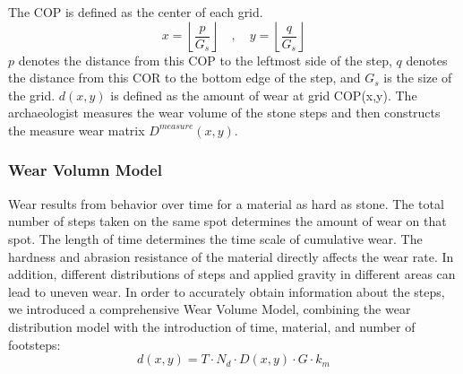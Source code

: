 \documentclass[12pt]{article}  %
\numberwithin{equation}{section} %
\begin{document}
The COP\cite{2} is defined as the center of each grid.
\begin{equation}
     x = \left\lfloor \frac{p}{G_s} \right\rfloor \quad,\quad y = \left\lfloor \frac{q}{G_s} \right\rfloor
\end{equation}
$p$ denotes the distance from this COP to the leftmost side of the step, $q$ denotes the distance from this COR to the bottom edge of the step, and $G_s$ is the size of the grid. $d(x,y)$ is defined as the amount of wear at grid COP(x,y). The archaeologist measures the wear volume of the stone steps and then constructs the measure wear matrix $D^{measure}(x,y)$.
\subsubsection{Wear Volumn Model}
Wear results from behavior over time for a material as hard as stone. The total number of steps taken on the same spot determines the amount of wear on that spot. The length of time determines the time scale of cumulative wear. The hardness and abrasion resistance of the material directly affects the wear rate. In addition, different distributions of steps and applied gravity in different areas can lead to uneven wear. In order to accurately obtain information about the steps, we introduced a comprehensive Wear Volume Model, combining the wear distribution model with the introduction of time, material, and number of footsteps:
\begin{equation}
    d(x,y) = T\cdot{N_d}\cdot{D(x,y)}\cdot{G}\cdot{k_m}
    \label{equation3.2}
\end{equation}
\end{document}
